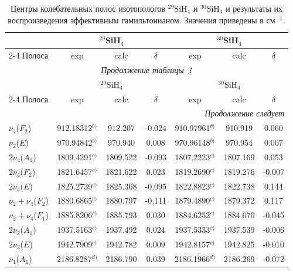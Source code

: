 \begingroup
\scriptsize
\setlength{\tabcolsep}{3pt}
\renewcommand{\arraystretch}{1.05}
\begin{longtable}{lccc ccc}
\caption{Центры колебательных полос изотопологов ${}^{29}$SiH$_4$ и ${}^{30}$SiH$_4$ и результаты их воспроизведения эффективным гамильтонианом. Значения приведены в см$^{-1}$.}\label{tab:si_band_centers_fit_29_30}\\
\hline
& \multicolumn{3}{c}{${}^{29}$SiH$_4$} & \multicolumn{3}{c}{${}^{30}$SiH$_4$}\\
\cline{2-4}\cline{5-7}
Полоса & exp & calc & $\delta$ & exp & calc & $\delta$ \\
\hline
\endfirsthead
\hline
\multicolumn{7}{c}{\small\slshape Продолжение таблицы~\ref{tab:si_band_centers_fit_29_30}}\\
\hline
& \multicolumn{3}{c}{${}^{29}$SiH$_4$} & \multicolumn{3}{c}{${}^{30}$SiH$_4$}\\
\cline{2-4}\cline{5-7}
Полоса & exp & calc & $\delta$ & exp & calc & $\delta$ \\
\hline
\endhead
\hline
\multicolumn{7}{r}{\small\slshape Продолжение следует}\\
\endfoot
\hline\hline
\endlastfoot
$\nu_4$($F_2$) & 912.18312$^{b)}$ & 912.207 & -0.024 & 910.97961$^{b)}$ & 910.919 & 0.060 \\
$\nu_2$($E$) & 970.94842$^{b)}$ & 970.940 & 0.008 & 970.96148$^{b)}$ & 970.954 & 0.007 \\
$2\nu_4$($A_1$) & 1809.4291$^{c)}$ & 1809.522 & -0.093 & 1807.2223$^{c)}$ & 1807.169 & 0.053 \\
$2\nu_4$($F_2$) & 1821.6457$^{c)}$ & 1821.622 & 0.023 & 1819.2690$^{c)}$ & 1819.276 & -0.007 \\
$2\nu_4$($E  $) & 1825.2739$^{c)}$ & 1825.368 & -0.095 & 1822.8823$^{c)}$ & 1822.738 & 0.144 \\
$\nu_2+\nu_4$($F_2$) & 1880.6865$^{c)}$ & 1880.797 & -0.111 & 1879.4890$^{c)}$ & 1879.372 & 0.117 \\
$\nu_2+\nu_4$($F_1$) & 1885.8206$^{c)}$ & 1885.793 & 0.030 & 1884.6252$^{c)}$ & 1884.670 & -0.045 \\
$2\nu_2$($A_1$) & 1937.5163$^{c)}$ & 1937.492 & 0.024 & 1937.5333$^{c)}$ & 1937.539 & -0.006 \\
$2\nu_2$($E  $) & 1942.7909$^{c)}$ & 1942.782 & 0.009 & 1942.8157$^{c)}$ & 1942.825 & -0.010 \\
$\nu_1$($A_1$) & 2186.8287$^{d)}$ & 2186.790 & 0.039 & 2186.1966$^{d)}$ & 2186.269 & -0.072 \\

\end{longtable}
